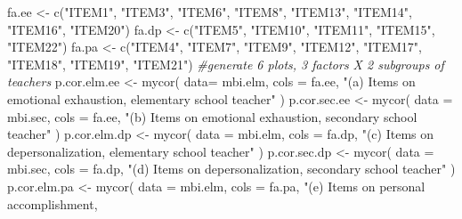 \documentclass[
]{article}
\newenvironment{Shaded}{\begin{snugshade}}{\end{snugshade}}
\newcommand{\AttributeTok}[1]{\textcolor[rgb]{0.77,0.63,0.00}{#1}}
\newcommand{\CommentTok}[1]{\textcolor[rgb]{0.56,0.35,0.01}{\textit{#1}}}
\newcommand{\FunctionTok}[1]{\textcolor[rgb]{0.00,0.00,0.00}{#1}}
\newcommand{\NormalTok}[1]{#1}
\newcommand{\OtherTok}[1]{\textcolor[rgb]{0.56,0.35,0.01}{#1}}
\newcommand{\StringTok}[1]{\textcolor[rgb]{0.31,0.60,0.02}{#1}}
\begin{document}
\begin{Shaded}
\begin{Highlighting}[]
\NormalTok{fa.ee }\OtherTok{\textless{}{-}} \FunctionTok{c}\NormalTok{(}\StringTok{"ITEM1"}\NormalTok{, }\StringTok{"ITEM3"}\NormalTok{, }\StringTok{"ITEM6"}\NormalTok{, }\StringTok{"ITEM8"}\NormalTok{, }\StringTok{"ITEM13"}\NormalTok{, }\StringTok{"ITEM14"}\NormalTok{, }\StringTok{"ITEM16"}\NormalTok{, }\StringTok{"ITEM20"}\NormalTok{)}
\NormalTok{fa.dp }\OtherTok{\textless{}{-}} \FunctionTok{c}\NormalTok{(}\StringTok{"ITEM5"}\NormalTok{, }\StringTok{"ITEM10"}\NormalTok{, }\StringTok{"ITEM11"}\NormalTok{, }\StringTok{"ITEM15"}\NormalTok{, }\StringTok{"ITEM22"}\NormalTok{)}
\NormalTok{fa.pa }\OtherTok{\textless{}{-}} \FunctionTok{c}\NormalTok{(}\StringTok{"ITEM4"}\NormalTok{, }\StringTok{"ITEM7"}\NormalTok{, }\StringTok{"ITEM9"}\NormalTok{, }\StringTok{"ITEM12"}\NormalTok{, }\StringTok{"ITEM17"}\NormalTok{, }\StringTok{"ITEM18"}\NormalTok{, }\StringTok{"ITEM19"}\NormalTok{, }\StringTok{"ITEM21"}\NormalTok{)}
\CommentTok{\#generate 6 plots, 3 factors X 2 subgroups of teachers}
\NormalTok{p.cor.elm.ee }\OtherTok{\textless{}{-}} 
       \FunctionTok{mycor}\NormalTok{(}
         \AttributeTok{data=}\NormalTok{ mbi.elm, }
         \AttributeTok{cols =}\NormalTok{ fa.ee, }
         \StringTok{"(a) Items on emotional exhaustion, }
\StringTok{         elementary school teacher"}
\NormalTok{         )}
\NormalTok{p.cor.sec.ee }\OtherTok{\textless{}{-}} 
       \FunctionTok{mycor}\NormalTok{(}
         \AttributeTok{data =}\NormalTok{ mbi.sec, }
         \AttributeTok{cols =}\NormalTok{ fa.ee, }
         \StringTok{"(b) Items on emotional exhaustion, }
\StringTok{          secondary school teacher"}
\NormalTok{         )}
\NormalTok{p.cor.elm.dp }\OtherTok{\textless{}{-}} 
       \FunctionTok{mycor}\NormalTok{(}
         \AttributeTok{data =}\NormalTok{ mbi.elm, }
         \AttributeTok{cols =}\NormalTok{ fa.dp, }
         \StringTok{"(c) Items on depersonalization,}
\StringTok{          elementary school teacher"}
\NormalTok{         )}
\NormalTok{p.cor.sec.dp }\OtherTok{\textless{}{-}} 
       \FunctionTok{mycor}\NormalTok{(}
         \AttributeTok{data =}\NormalTok{ mbi.sec, }
         \AttributeTok{cols =}\NormalTok{ fa.dp, }
         \StringTok{"(d) Items on depersonalization,}
\StringTok{          secondary school teacher"}
\NormalTok{         )}
\NormalTok{p.cor.elm.pa }\OtherTok{\textless{}{-}} 
       \FunctionTok{mycor}\NormalTok{(}
         \AttributeTok{data =}\NormalTok{ mbi.elm, }
         \AttributeTok{cols =}\NormalTok{ fa.pa, }
         \StringTok{"(e) Items on personal accomplishment,}

\end{Highlighting}
\end{Shaded}
\end{document}
